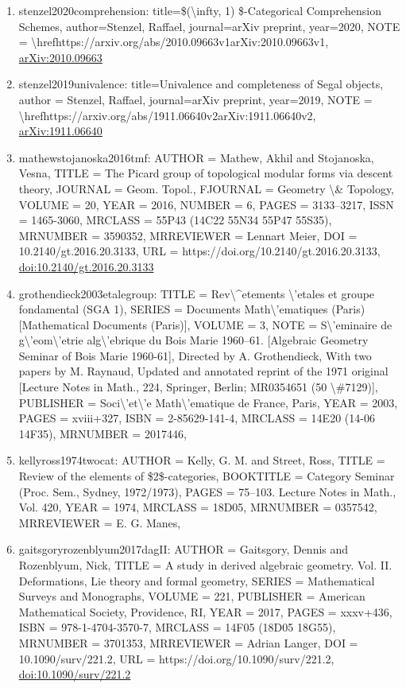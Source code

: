 \documentclass[11pt]{article}
\begin{document}
\begin{enumerate}[leftmargin=*]
  \item stenzel2020comprehension: title=\$(\textbackslash{}infty, 1) \$-Categorical Comprehension Schemes, author=Stenzel, Raffael, journal=arXiv preprint, year=2020, NOTE = \textbackslash{}hrefhttps://arxiv.org/abs/2010.09663v1arXiv:2010.09663v1, \href{https://arxiv.org/abs/2010.09663}{arXiv:2010.09663}
  \item stenzel2019univalence: title=Univalence and completeness of Segal objects, author = Stenzel, Raffael, journal=arXiv preprint, year=2019, NOTE = \textbackslash{}hrefhttps://arxiv.org/abs/1911.06640v2arXiv:1911.06640v2, \href{https://arxiv.org/abs/1911.06640}{arXiv:1911.06640}
  \item mathewstojanoska2016tmf: AUTHOR = Mathew, Akhil and Stojanoska, Vesna, TITLE = The Picard group of topological modular forms via descent theory, JOURNAL = Geom. Topol., FJOURNAL = Geometry \textbackslash{}\& Topology, VOLUME = 20, YEAR = 2016, NUMBER = 6, PAGES = 3133--3217, ISSN = 1465-3060, MRCLASS = 55P43 (14C22 55N34 55P47 55S35), MRNUMBER = 3590352, MRREVIEWER = Lennart Meier, DOI = 10.2140/gt.2016.20.3133, URL = https://doi.org/10.2140/gt.2016.20.3133, \href{https://doi.org/10.2140/gt.2016.20.3133}{doi:10.2140/gt.2016.20.3133}
  \item grothendieck2003etalegroup: TITLE = Rev\textbackslash{}\^{}etements \textbackslash{}'etales et groupe fondamental (SGA 1), SERIES = Documents Math\textbackslash{}'ematiques (Paris) [Mathematical Documents (Paris)], VOLUME = 3, NOTE = S\textbackslash{}'eminaire de g\textbackslash{}'eom\textbackslash{}'etrie alg\textbackslash{}'ebrique du Bois Marie 1960--61. [Algebraic Geometry Seminar of Bois Marie 1960-61], Directed by A. Grothendieck, With two papers by M. Raynaud, Updated and annotated reprint of the 1971 original [Lecture Notes in Math., 224, Springer, Berlin; MR0354651 (50 \textbackslash{}\#7129)], PUBLISHER = Soci\textbackslash{}'et\textbackslash{}'e Math\textbackslash{}'ematique de France, Paris, YEAR = 2003, PAGES = xviii+327, ISBN = 2-85629-141-4, MRCLASS = 14E20 (14-06 14F35), MRNUMBER = 2017446,
  \item kellyross1974twocat: AUTHOR = Kelly, G. M. and Street, Ross, TITLE = Review of the elements of \$2\$-categories, BOOKTITLE = Category Seminar (Proc. Sem., Sydney, 1972/1973), PAGES = 75--103. Lecture Notes in Math., Vol. 420, YEAR = 1974, MRCLASS = 18D05, MRNUMBER = 0357542, MRREVIEWER = E. G. Manes,
  \item gaitsgoryrozenblyum2017dagII: AUTHOR = Gaitsgory, Dennis and Rozenblyum, Nick, TITLE = A study in derived algebraic geometry. Vol. II. Deformations, Lie theory and formal geometry, SERIES = Mathematical Surveys and Monographs, VOLUME = 221, PUBLISHER = American Mathematical Society, Providence, RI, YEAR = 2017, PAGES = xxxv+436, ISBN = 978-1-4704-3570-7, MRCLASS = 14F05 (18D05 18G55), MRNUMBER = 3701353, MRREVIEWER = Adrian Langer, DOI = 10.1090/surv/221.2, URL = https://doi.org/10.1090/surv/221.2, \href{https://doi.org/10.1090/surv/221.2}{doi:10.1090/surv/221.2}

\end{enumerate}
\end{document}
